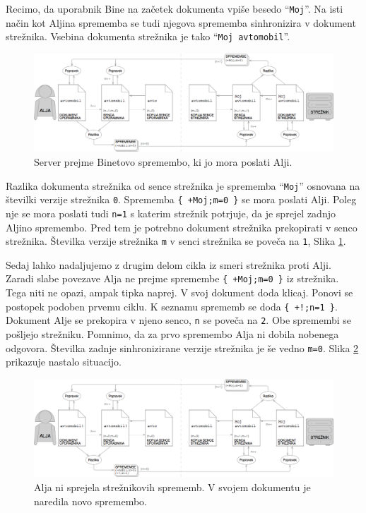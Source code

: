\documentclass[a4paper, 12pt, twoside]{book}
\begin{document}
Recimo, da uporabnik Bine na začetek dokumenta vpiše besedo “{\tt Moj}”. Na isti način kot Aljina sprememba se tudi njegova sprememba sinhronizira v dokument strežnika. Vsebina dokumenta strežnika je tako “{\tt Moj avtomobil}”.

\begin{figure}[placement h]
\begin{center}
\includegraphics[width=16cm]{ds6.png}
\end{center}
\caption{Server prejme Binetovo spremembo, ki jo mora poslati Alji.}
\label{ds6}
\end{figure}

Razlika dokumenta strežnika od sence strežnika je sprememba “{\tt Moj}” osnovana na številki verzije strežnika {\tt 0}. Sprememba {\tt \{ +Moj;m=0 \}} se mora poslati Alji. Poleg nje se mora poslati tudi {\tt n=1} s katerim strežnik potrjuje, da je sprejel zadnjo Aljino spremembo. Pred tem je potrebno dokument strežnika prekopirati v senco strežnika. Številka verzije strežnika {\tt m} v senci strežnika se poveča na {\tt 1}, Slika \ref{ds6}.

Sedaj lahko nadaljujemo z drugim delom cikla iz smeri strežnika proti Alji. Zaradi slabe povezave Alja ne prejme spremembe {\tt \{ +Moj;m=0 \}} iz strežnika. Tega niti ne opazi, ampak tipka naprej. V svoj dokument doda klicaj. Ponovi se postopek podoben prvemu ciklu. K seznamu sprememb se doda {\tt \{ +!;n=1 \}}. Dokument Alje se prekopira v njeno senco, {\tt n} se poveča na {\tt 2}. Obe spremembi se pošljejo strežniku. Pomnimo, da za prvo spremembo Alja ni dobila nobenega odgovora. Številka zadnje sinhronizirane verzije strežnika je še vedno {\tt m=0}. Slika \ref{ds7} prikazuje nastalo situacijo.

\begin{figure}[placement h]
\begin{center}
\includegraphics[width=16cm]{ds7.png}
\end{center}
\caption{Alja ni sprejela strežnikovih sprememb. V svojem dokumentu je naredila novo spremembo.}
\label{ds7}
\end{figure}
\end{document}

